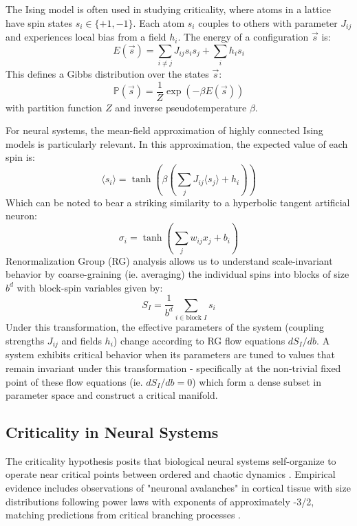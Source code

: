 The Ising model is often used in studying criticality, where atoms in a lattice have spin states $s_i \in \{+1, -1\}$. Each atom $s_i$ couples to others with parameter $J_{ij}$ and experiences local bias from a field $h_i$. The energy of a configuration $\vec{s}$ is:
\begin{equation}E(\vec{s}) = \sum_{i\neq j} J_{ij} s_is_j + \sum_i h_is_i\end{equation}
This defines a Gibbs distribution over the states $\vec{s}$:
\begin{equation}\mathbb{P}(\vec{s})=\dfrac{1}{Z}\exp(-\beta E(\vec{s}))\end{equation}
with partition function $Z$ and inverse pseudotemperature $\beta$.

For neural systems, the mean-field approximation of highly connected Ising models is particularly relevant. In this approximation, the expected value of each spin is:
\begin{equation}
\langle s_i \rangle = \tanh(\beta(\sum_j J_{ij}\langle s_j \rangle + h_i))
\end{equation}
Which can be noted to bear a striking similarity to a hyperbolic tangent artificial neuron:
\begin{equation}
\sigma_i = \tanh(\sum_j w_{ij}x_j + b_i)
\end{equation}
Renormalization Group (RG) analysis allows us to understand scale-invariant behavior by coarse-graining (ie. averaging) the individual spins into blocks of size $b^d$ with block-spin variables given by:
\begin{equation}
S_I = \frac{1}{b^d}\sum_{i \in \text{block } I} s_i
\end{equation} Under this transformation, the effective parameters of the system (coupling strengths $J_{ij}$ and fields $h_i$) change according to RG flow equations $dS_I/db$. A system exhibits critical behavior when its parameters are tuned to values that remain invariant under this transformation  - specifically at the non-trivial fixed point of these flow equations (ie. $dS_I/db=0$) which form a dense subset in parameter space and construct a critical manifold.

\subsection{Criticality in Neural Systems}

The criticality hypothesis posits that biological neural systems self-organize to operate near critical points between ordered and chaotic dynamics \cite{Beggsetal2003, Beggsetal2012}. Empirical evidence includes observations of "neuronal avalanches" in cortical tissue with size distributions following power laws with exponents of approximately -3/2, matching predictions from critical branching processes \cite{Beggsetal2003}. 

